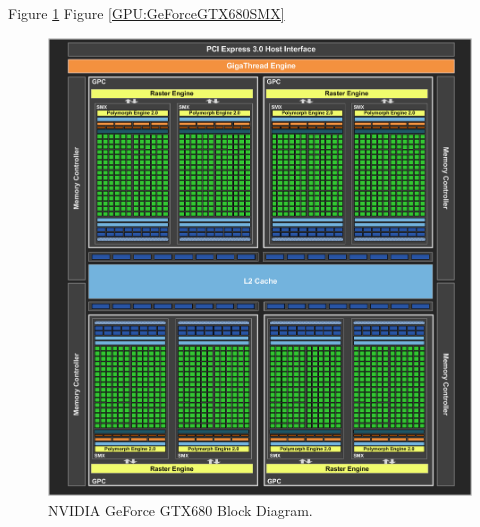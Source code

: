 Figure \ref{GPU:GeForceGTX680BlockDiagram}
Figure \ref{GPU:GeForceGTX680SMX}

\begin{figure}
\centering
\includegraphics[width=\textwidth]{GPU/GeForceGTX680BlockDiagram.png}
\caption{NVIDIA GeForce GTX680 Block Diagram.}
\label{GPU:GeForceGTX680BlockDiagram}
\end{figure}

